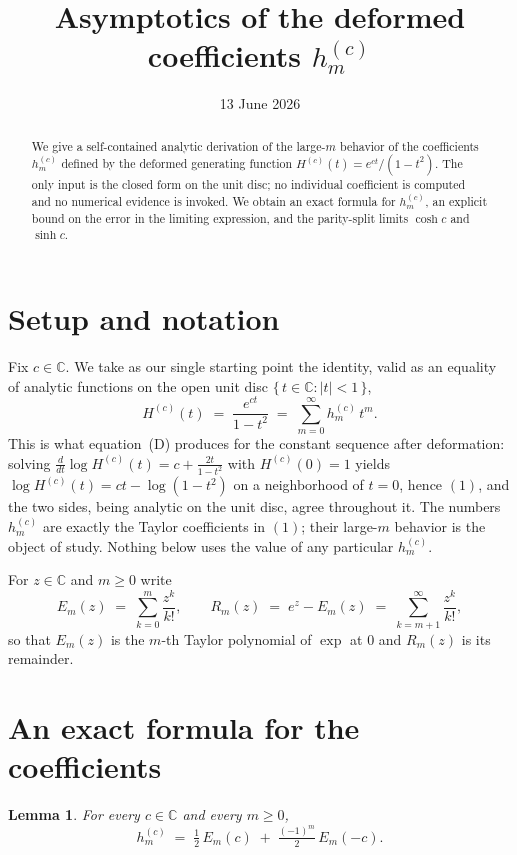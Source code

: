 \documentclass[11pt, fleqn]{amsart}
\title{Asymptotics of the deformed coefficients $h^{(c)}_m$}
\author{}
\date{13 June 2026}
\newtheorem{lemma}[theorem]{Lemma}
\theoremstyle{remark}
\begin{document}
\maketitle

\begin{abstract}
We give a self-contained analytic derivation of the large-$m$ behavior of the
coefficients $h^{(c)}_m$ defined by the deformed generating function
$H^{(c)}(t)=e^{ct}/(1-t^2)$. The only input is the closed form on the unit disc;
no individual coefficient is computed and no numerical evidence is invoked. We
obtain an exact formula for $h^{(c)}_m$, an explicit bound on the error in the
limiting expression, and the parity-split limits $\cosh c$ and $\sinh c$.
\end{abstract}

\section{Setup and notation}
Fix $c\in\mathbb{C}$. We take as our single starting point the identity, valid
as an equality of analytic functions on the open unit disc $\{\,t\in\mathbb{C}:|t|<1\,\}$,
\begin{equation}
H^{(c)}(t)\;=\;\frac{e^{ct}}{1-t^2}\;=\;\sum_{m=0}^{\infty}h^{(c)}_m\,t^m.
\tag{1}
\end{equation}
This is what equation~(D) produces for the constant sequence after deformation:
solving $\frac{d}{dt}\log H^{(c)}(t)=c+\frac{2t}{1-t^2}$ with $H^{(c)}(0)=1$ yields
$\log H^{(c)}(t)=ct-\log(1-t^2)$ on a neighborhood of $t=0$, hence $(1)$, and the
two sides, being analytic on the unit disc, agree throughout it. The numbers
$h^{(c)}_m$ are exactly the Taylor coefficients in $(1)$; their large-$m$ behavior
is the object of study. Nothing below uses the value of any particular
$h^{(c)}_m$.

For $z\in\mathbb{C}$ and $m\ge 0$ write
\[
E_m(z)\;=\;\sum_{k=0}^{m}\frac{z^{k}}{k!},
\qquad
R_m(z)\;=\;e^{z}-E_m(z)\;=\;\sum_{k=m+1}^{\infty}\frac{z^{k}}{k!},
\]
so that $E_m(z)$ is the $m$-th Taylor polynomial of $\exp$ at $0$ and $R_m(z)$ is
its remainder.

\section{An exact formula for the coefficients}

\begin{lemma}\label{lem:exact}
For every $c\in\mathbb{C}$ and every $m\ge 0$,
\[
h^{(c)}_m\;=\;\tfrac12\,E_m(c)\;+\;\tfrac{(-1)^m}{2}\,E_m(-c).
\]
\end{lemma}
\end{document}
